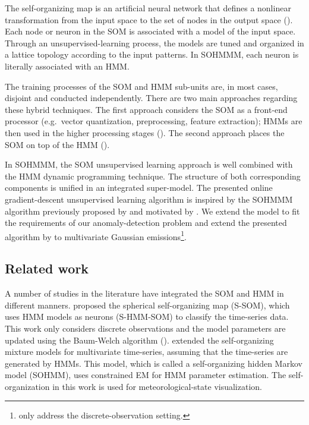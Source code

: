The self-organizing map is an artificial neural network that defines a nonlinear transformation from the input space to the set of nodes in the output space (\citet{Somervuo2000}). Each node or neuron in the SOM is associated with a model of the input space. Through an unsupervised-learning process, the models are tuned and organized in a lattice topology according to the input patterns. In SOHMMM, each neuron is literally associated with an HMM.

The training processes of the SOM and HMM sub-units are, in most cases, disjoint and conducted independently. There are two main approaches regarding these hybrid techniques. The first approach considers the SOM as a front-end processor (e.g.\ vector quantization, preprocessing, feature extraction); HMMs are then used in the higher processing stages (\citet{Somervuo2000,Kurimo1996,Morimoto2016}). The second approach places the SOM on top of the HMM (\citet{Ferles2013,Ferles2013b,Lebbah2015}).

In SOHMMM, the SOM unsupervised learning approach is well combined with the HMM dynamic programming technique. The structure of both corresponding components is unified in an integrated super-model. The presented online gradient-descent unsupervised learning algorithm is inspired by the SOHMMM algorithm previously proposed by \citet{Ferles2013} and motivated by \citet{Baldi1994}. We extend the model to fit the requirements of our anomaly-detection problem and extend the presented algorithm by \citet{Ferles2013} to multivariate Gaussian emissions\footnote{\citet{Ferles2013} only address the discrete-observation setting.}.

\subsection{Related work}
A number of studies in the literature have integrated the SOM and HMM in different manners. \citet{Gen2012} proposed the spherical self-organizing map (S-SOM), which uses HMM models as neurons (S-HMM-SOM) to classify the time-series data. This work only considers discrete observations and the model parameters are updated using the Baum-Welch algorithm (\citet{Baum1972}). \citet{Yamaguchi2010} extended the self-organizing mixture models for multivariate time-series, assuming that the time-series are generated by HMMs. This model, which is called a self-organizing hidden Markov model (SOHMM), uses constrained EM for HMM parameter estimation. The self-organization in this work is used for meteorological-state visualization.

